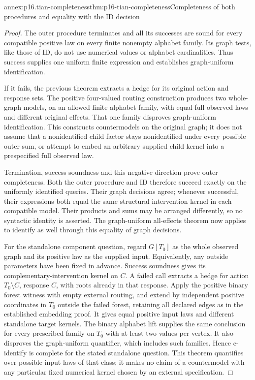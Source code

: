 \begin{annexitem}{annex:p16.tian-completeness}{thm:p16-tian-completeness}{Completeness of both procedures and equality with the ID decision}
\begin{proof}
The outer procedure terminates and all its successes are sound
for every compatible positive law on every finite nonempty alphabet
family. Its graph tests, like those of ID, do not use numerical
values or alphabet cardinalities. Thus success supplies one uniform
finite expression and establishes graph-uniform identification.

If it fails, the previous theorem extracts a hedge for its original
action and response sets. The positive four-valued routing construction
produces two whole-graph models, on an allowed finite alphabet family,
with equal full observed laws and different original effects. That
one family disproves graph-uniform identification. This constructs
countermodels on the original graph; it does not assume that a
nonidentified child factor stays nonidentified under every possible
outer sum, or attempt to embed an arbitrary supplied child kernel
into a prespecified full observed law.

Termination, success soundness and this negative direction prove
outer completeness. Both the outer procedure and ID therefore
succeed exactly on the uniformly identified queries. Their graph
decisions agree; whenever successful, their expressions both equal
the same structural intervention kernel in each compatible model.
Their products and sums may be arranged differently, so no syntactic
identity is asserted. The graph-uniform all-effects theorem now applies
to identify as well through this equality of graph decisions.

For the standalone component question, regard \(G[T_0]\) as
the whole observed graph and its positive law as the supplied input.
Equivalently, any outside parameters have been fixed in advance.
Success soundness gives its complementary-intervention kernel on
\(C\). A failed call extracts a hedge for action
\(T_0\setminus C\), response \(C\), with roots already
in that response. Apply the positive binary forest witness with
empty external routing, and extend by independent positive coordinates
in \(T_0\) outside the failed forest, retaining all declared
edges as in the established embedding proof. It gives equal positive
input laws and different standalone target kernels. The binary
alphabet lift supplies the same conclusion for every prescribed
family on \(T_0\) with at least two values per vertex. It also
disproves the graph-uniform quantifier, which includes such families.
Hence c-identify is complete for the stated standalone question.
This theorem quantifies over possible input laws of that class;
it makes no claim of a countermodel with any particular fixed
numerical kernel chosen by an external specification.
\end{proof}
\end{annexitem}

